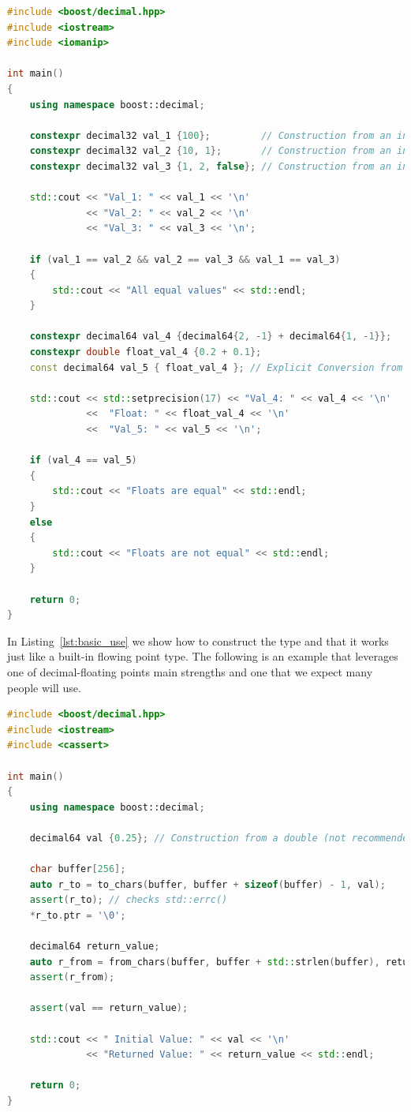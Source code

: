 \documentclass[acmsmall]{acmart}
\begin{document}
\begin{lstlisting}[language=C++, caption={Basic Usage}, label={lst:basic_use}]
#include <boost/decimal.hpp>
#include <iostream>
#include <iomanip>

int main()
{
    using namespace boost::decimal;

    constexpr decimal32 val_1 {100};         // Construction from an integer
    constexpr decimal32 val_2 {10, 1};       // Construction from an integer and exponent
    constexpr decimal32 val_3 {1, 2, false}; // Construction from an integer, exponent, and sign

    std::cout << "Val_1: " << val_1 << '\n'
              << "Val_2: " << val_2 << '\n'
              << "Val_3: " << val_3 << '\n';

    if (val_1 == val_2 && val_2 == val_3 && val_1 == val_3)
    {
        std::cout << "All equal values" << std::endl;
    }

    constexpr decimal64 val_4 {decimal64{2, -1} + decimal64{1, -1}};
    constexpr double float_val_4 {0.2 + 0.1};
    const decimal64 val_5 { float_val_4 }; // Explicit Conversion from double

    std::cout << std::setprecision(17) << "Val_4: " << val_4 << '\n'
              <<  "Float: " << float_val_4 << '\n'
              <<  "Val_5: " << val_5 << '\n';

    if (val_4 == val_5)
    {
        std::cout << "Floats are equal" << std::endl;
    }
    else
    {
        std::cout << "Floats are not equal" << std::endl;
    }

    return 0;
}
\end{lstlisting}

In Listing~\ref{lst:basic_use} we show how to construct the type and that it works just like a built-in flowing point type. 
The following is an example that leverages one of decimal-floating points main strengths and one that we expect many people will use.

\begin{lstlisting}[language=C++, caption={Basic Usage}, label={lst:charconv_use}]
#include <boost/decimal.hpp>
#include <iostream>
#include <cassert>

int main()
{
    using namespace boost::decimal;

    decimal64 val {0.25}; // Construction from a double (not recommended but explicit construction is allowed)

    char buffer[256];
    auto r_to = to_chars(buffer, buffer + sizeof(buffer) - 1, val);
    assert(r_to); // checks std::errc()
    *r_to.ptr = '\0';

    decimal64 return_value;
    auto r_from = from_chars(buffer, buffer + std::strlen(buffer), return_value);
    assert(r_from);

    assert(val == return_value);

    std::cout << " Initial Value: " << val << '\n'
              << "Returned Value: " << return_value << std::endl;

    return 0;
}
\end{lstlisting}
\end{document}
